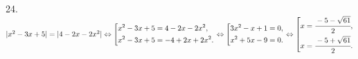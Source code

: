 24. $|x^2-3x+5|=|4-2x-2x^2|\Leftrightarrow
\left[
      \begin{gathered}
        x^2-3x+5=4-2x-2x^2, \hfill
        \\
        x^2-3x+5=-4+2x+2x^2. \hfill
        \\
      \end{gathered}
    \right. \hfill  \Leftrightarrow
\left[
      \begin{gathered}
        3x^2-x+1=0, \hfill
        \\
        x^2+5x-9=0. \hfill
        \\
      \end{gathered}
    \right. \hfill
    \Leftrightarrow
\left[
      \begin{gathered}
        x=\cfrac{-5-\sqrt{61}}{2}, \hfill
        \\
        x=\cfrac{-5+\sqrt{61}}{2}.
      \end{gathered}
    \right. \hfill     $\\
